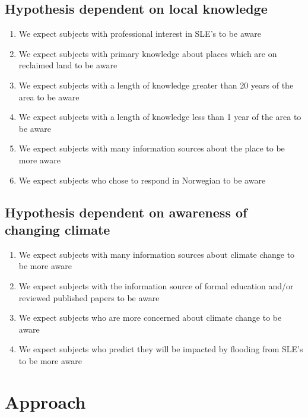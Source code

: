 \subsection{Hypothesis dependent on local knowledge}
\begin{enumerate}
    \item We expect subjects with professional interest in SLE's to be aware
    \item We expect subjects with primary knowledge about places which are on reclaimed land to be aware
    \item We expect subjects with a length of knowledge greater than 20 years of the area to be aware
    \item We expect subjects with a length of knowledge less than 1 year of the area to be aware
    \item We expect subjects with many information sources about the place to be more aware
    \item We expect subjects who chose to respond in Norwegian to be aware
\end{enumerate}
\paragraph{}

\subsection{Hypothesis dependent on awareness of changing climate}
\begin{enumerate}
    \item We expect subjects with many information sources about climate change to be more aware
    \item We expect subjects with the information source of formal education and/or reviewed published papers to be aware
    \item We expect subjects who are more concerned about climate change to be aware
    \item We expect subjects who predict they will be impacted by flooding from SLE's to be more aware
\end{enumerate}



\section{Approach}


